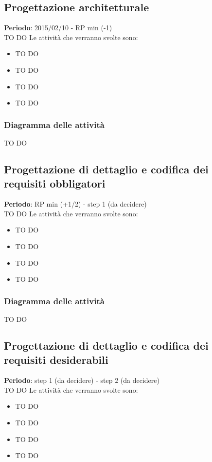 	\subsection{Progettazione architetturale} %
	\label{sub:progettazione_architetturale}
	\textbf{Periodo}:  2015/02/10 - RP min (-1) \\
	TO DO
	Le attività che verranno svolte sono:
		\begin{itemize}
			\item TO DO
			\item TO DO
			\item TO DO
			\item TO DO
		\end{itemize}
		
		\subsubsection{Diagramma delle attività} %
		\label{ssub:diagramma_delle_attivita}
		TO DO
	
	\subsection{Progettazione di dettaglio e codifica dei requisiti obbligatori} %
	\label{sub:progettazione_di_dettaglio_e_codifica_dei_requisiti_obbligatori}
	\textbf{Periodo}:  RP min (+1/2) - step 1 (da decidere) \\
	TO DO
	Le attività che verranno svolte sono:
		\begin{itemize}
			\item TO DO
			\item TO DO
			\item TO DO
			\item TO DO
		\end{itemize}
		
		\subsubsection{Diagramma delle attività} %
		\label{ssub:diagramma_delle_attivita}
		TO DO
	
	\subsection{Progettazione di dettaglio e codifica dei requisiti desiderabili} %
	\label{sub:progettazione_di_dettaglio_e_codifica_dei_requisiti_desiderabili}
	\textbf{Periodo}:  step 1 (da decidere) - step 2 (da decidere) \\
	TO DO
	Le attività che verranno svolte sono:
		\begin{itemize}
			\item TO DO
			\item TO DO
			\item TO DO
			\item TO DO
		\end{itemize}
		
